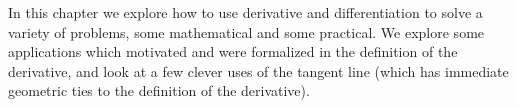 In this chapter we explore how to use derivative and
differentiation to solve a variety of problems, some mathematical and some
practical. We explore some applications which motivated and were formalized
in the definition of the derivative, and look at a few clever uses of the tangent line
(which has immediate geometric ties to the definition of the derivative).

%
%
